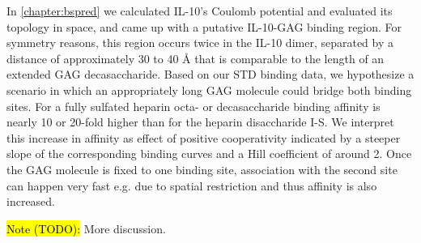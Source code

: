 In \cref{chapter:bspred} we calculated IL-10's Coulomb potential and evaluated
its topology in space, and came up with a putative IL-10-GAG binding region. For
symmetry reasons, this region occurs twice in the IL-10 dimer, separated by a
distance of approximately 30 to 40 Å that is comparable to the length of an
extended GAG decasaccharide. Based on our STD binding data, we hypothesize a
scenario in which an appropriately long GAG molecule could bridge both binding
sites. For a fully sulfated heparin octa- or decasaccharide binding affinity is
nearly 10 or 20-fold higher than for the heparin disaccharide I-S. We interpret
this increase in affinity as effect of positive cooperativity indicated by a
steeper slope of the corresponding binding curves and a Hill coefficient of
around 2. Once the GAG molecule is fixed to one binding site, association with
the second site can happen very fast e.g. due to spatial restriction and thus
affinity is also increased.

\hl{Note (TODO):}
More discussion.



